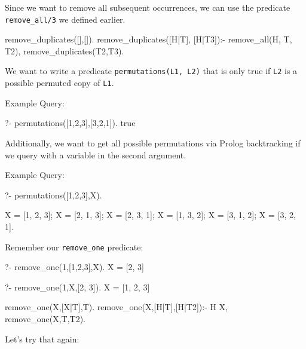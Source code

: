 Since we want to remove all subsequent occurrences, we can use the predicate \texttt{remove\_all/3} we defined earlier.

\begin{codeblock}
remove_duplicates([],[]).
remove_duplicates([H|T], [H|T3]):-
    remove_all(H, T, T2),
    remove_duplicates(T2,T3).
\end{codeblock}


We want to write a predicate \texttt{permutations(L1, L2)} that is only true if \texttt{L2} is a possible permuted copy of \texttt{L1}.

Example Query:
\begin{codeblock}
?- permutations([1,2,3],[3,2,1]).
true
\end{codeblock}

Additionally, we want to get all possible permutations via Prolog backtracking if we query with a variable in the second argument.

Example Query:
\begin{codeblock}
?- permutations([1,2,3],X).

X = [1, 2, 3];
X = [2, 1, 3];
X = [2, 3, 1];
X = [1, 3, 2];
X = [3, 1, 2];
X = [3, 2, 1].
\end{codeblock}

Remember our \texttt{remove\_one} predicate:

\begin{codeblock}
?- remove_one(1,[1,2,3],X).
X = [2, 3]
\end{codeblock}


\begin{codeblock}
?- remove_one(1,X,[2, 3]).
X = [1, 2, 3]
\end{codeblock}



\begin{codeblock}
remove_one(X,[X|T],T).         %
remove_one(X,[H|T],[H|T2]):-
    H \= X,
    remove_one(X,T,T2).
\end{codeblock}

Let's try that again:


